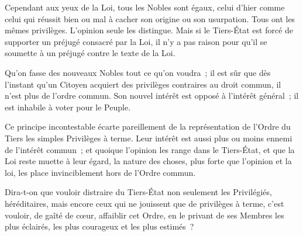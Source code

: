 \documentclass[french,twoside]{book} %
\begin{document}
Cependant aux yeux de la Loi, tous les Nobles sont égaux, celui d’hier comme celui qui réussit bien ou mal à cacher son origine ou son usurpation. Tous ont les mêmes privilèges. L’opinion seule les distingue. Mais si le Tiers-État est forcé de supporter un préjugé consacré par la Loi, il n’y a pas raison pour qu’il se soumette à un préjugé contre le texte de la Loi.\par
Qu’on fasse des nouveaux Nobles tout ce qu’on voudra ; il est sûr que dès l’instant qu’un Citoyen acquiert des privilèges contraires au droit commun, il n’est plus de l’ordre commun. Son nouvel intérêt est opposé à l’intérêt général ; il est inhabile à voter pour le Peuple.\par
Ce principe incontestable écarte pareillement de la représentation de l’Ordre du Tiers les simples Privilèges à terme. Leur intérêt est aussi plus ou moins ennemi de l’intérêt commun ; et quoique l’opinion les range dans le Tiers-État, et que la Loi reste muette à leur égard, la nature des choses, plus forte que l’opinion et la loi, les place invinciblement hors de l’Ordre commun.\par
Dira-t-on que vouloir distraire du Tiers-État non seulement les Privilégiés, héréditaires, mais encore ceux qui ne jouissent que de privilèges à terme, c’est vouloir, de gaîté de cœur, affaiblir cet Ordre, en le privant de ses Membres les plus éclairés, les plus courageux et les plus estimés ?\par
\end{document}
